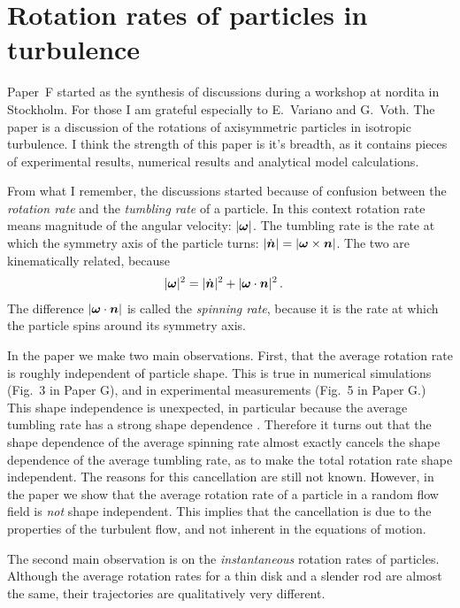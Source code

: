 \documentclass[thesis.tex]{subfiles}
\begin{document}
\chapter{Rotation rates of particles in turbulence}
Paper~F started as the synthesis of discussions during a workshop at {\sc nordita} in Stockholm. For those I am grateful especially to E.~Variano and G.~Voth. The paper is a discussion of the rotations of axisymmetric particles in isotropic turbulence. I think the strength of this paper is it's breadth, as it contains pieces of experimental results, numerical results and analytical model calculations.

From what I remember, the discussions started because of confusion between the \emph{rotation rate} and the \emph{tumbling rate} of a particle. In this context rotation rate means magnitude of the angular velocity: $|\mbox{\boldmath$\omega$}|$. The tumbling rate is the rate at which the symmetry axis of the particle turns: $|\dot{\mbox{\boldmath$n$}}|=|\mbox{\boldmath$\omega$} \times \mbox{\boldmath$n$}|$. The two are kinematically related, because
\begin{align}
    |\mbox{\boldmath$\omega$}|^2 &= |\dot{\mbox{\boldmath$n$}}|^2 + |\mbox{\boldmath$\omega$} \cdot \mbox{\boldmath$n$}|^2\,.
\end{align}
The difference $|\mbox{\boldmath$\omega$} \cdot \mbox{\boldmath$n$}|$ is called the \emph{spinning rate}, because it is the rate at which the particle spins around its symmetry axis.

In the paper we make two main observations. First, that the average rotation rate is roughly independent of particle shape. This is true in numerical simulations (Fig.~3 in Paper G), and in experimental measurements (Fig.~5 in Paper G.) This shape independence is unexpected, in particular because the average tumbling rate has a strong shape dependence \cite{parsa2012,gustavsson2014}. Therefore it turns out that the shape dependence of the average spinning rate almost exactly cancels the shape dependence of the average tumbling rate, as to make the total rotation rate shape independent. The reasons for this cancellation are still not known. However, in the paper we show that the average rotation rate of a particle in a random flow field is \emph{not} shape independent. This implies that the cancellation is due to the properties of the turbulent flow, and not inherent in the equations of motion.

The second main observation is on the \emph{instantaneous} rotation rates of particles. Although the average rotation rates for a thin disk and a slender rod are almost the same, their trajectories are qualitatively very different.
\end{document}
